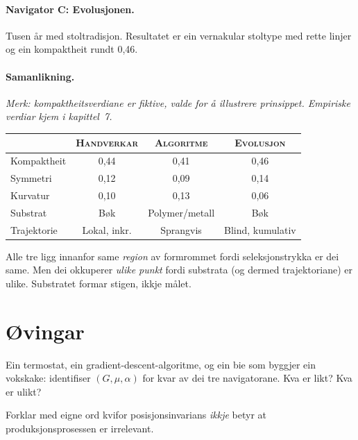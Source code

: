 \paragraph{Navigator C: Evolusjonen.}
Tusen år med stoltradisjon. Resultatet er ein vernakular stoltype
med rette linjer og ein kompaktheit rundt 0{,}46.

\paragraph{Samanlikning.}
\emph{Merk: kompaktheitsverdiane er fiktive, valde for å illustrere
prinsippet. Empiriske verdiar kjem i kapittel~7.}

\begin{center}
{\footnotesize
\begin{tabular}{@{}lccc@{}}
\toprule
& \textsc{Handverkar} & \textsc{Algoritme} & \textsc{Evolusjon} \\
\midrule
Kompaktheit & 0{,}44 & 0{,}41 & 0{,}46 \\
Symmetri & 0{,}12 & 0{,}09 & 0{,}14 \\
Kurvatur & 0{,}10 & 0{,}13 & 0{,}06 \\
\midrule
Substrat & Bøk & Polymer/metall & Bøk \\
Trajektorie & Lokal, inkr. & Sprangvis & Blind, kumulativ \\
\bottomrule
\end{tabular}
}
\end{center}

\medskip
Alle tre ligg innanfor same \emph{region} av formrommet fordi
seleksjonstrykka er dei same. Men dei okkuperer \emph{ulike punkt}
fordi substrata (og dermed trajektoriane) er ulike.
Substratet formar stigen, ikkje målet.


\section{Øvingar}

\begin{exercise}[Nivå 1]\label{ex:6.1}
Ein termostat, ein gradient-descent-algoritme, og ein bie som
byggjer ein vokskake: identifiser $(G, \mu, \alpha)$ for kvar av
dei tre navigatorane. Kva er likt? Kva er ulikt?
\end{exercise}

\begin{exercise}[Nivå 1]\label{ex:6.2}
Forklar med eigne ord kvifor posisjonsinvarians \emph{ikkje} betyr
at produksjonsprosessen er irrelevant.
\end{exercise}


